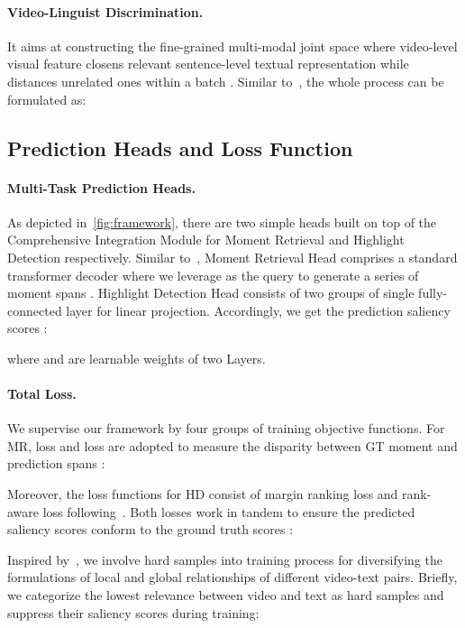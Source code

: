 \documentclass[10pt,twocolumn,letterpaper]{article}
\begin{document}
\paragraph{Video-Linguist Discrimination.} It aims at constructing the fine-grained multi-modal joint space where video-level visual feature  closens relevant sentence-level textual representation  while distances unrelated ones within a batch .
Similar to~\cite{clip}, the whole process can be formulated as:  


\subsection{Prediction Heads and Loss Function}
\label{sec:phlf}
\paragraph{Multi-Task Prediction Heads.}
As depicted in~\cref{fig:framework}, there are two simple heads built on top of the Comprehensive Integration Module for Moment Retrieval and Highlight Detection respectively.
Similar to~\cite{momentdetr,qddetr,eatr}, Moment Retrieval Head comprises a standard transformer decoder where we leverage  as the query to generate a series of moment spans .
Highlight Detection Head consists of two groups of single fully-connected layer for linear projection.
Accordingly, we get the prediction saliency scores :

where  and  are learnable weights of two Layers.

\paragraph{Total Loss.}
We supervise our framework by four groups of training objective functions.
For MR,  loss and  loss are adopted to measure the disparity between GT moment  and prediction spans  : 

Moreover, the loss functions for HD consist of margin ranking loss  and rank-aware loss  following~\cite{qddetr}. Both losses work in tandem to ensure the predicted saliency scores  conform to the ground truth scores  :

Inspired by~\cite{qddetr, dong2017}, we involve hard samples into training process for diversifying the formulations of local and global relationships of different video-text pairs. Briefly, we categorize the lowest relevance between video and text as hard samples and suppress their saliency scores  during training:   
\end{document}
